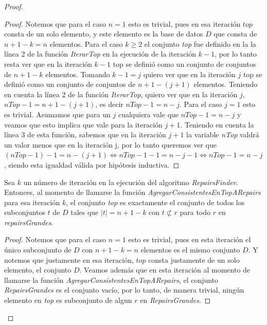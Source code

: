 \documentclass[11pt,a4paper,twoside]{tesis}
\begin{document}
\begin{proof}
\begin{proof}
Notemos que para el caso $n=1$ esto es trivial, pues en esa iteración $top$ consta de un solo elemento, y este elemento es la base de datos $D$ que consta de $n + 1 - k = n$ elementos. Para el caso $k \geq 2$ el conjunto \textit{top} fue definido en la la línea 2 de la función \textit{IterarTop} en la ejecución de la iteración $k-1$, por lo tanto resta ver que en la iteración $k-1$ top se definió como un conjunto de conjuntos de $n + 1 - k$ elementos. Tomando $k - 1 = j$ quiero ver que en la iteración $j$ top se definió como un conjunto de conjuntos de $n + 1 - (j + 1)$ elementos. Teniendo en cuenta la línea 2 de la función \textit{IterarTop}, quiero ver que en la iteración $j$, $nTop-1=n + 1 - (j + 1)$, es decir $nTop-1=n-j$. Para el caso $j=1$ esto es trivial. Asumamos que para un $j$ cualquiera vale que $nTop-1=n-j$ y veamos que esto implica que vale para la iteración $j+1$. Teniendo en cuenta la línea 3 de esta función, sabemos que en la iteración $j+1$ la variable \textit{nTop} valdrá un valor menos que en la iteración j, por lo tanto queremos ver que $(nTop-1) - 1 = n - (j+1) \iff nTop-1 - 1 = n - j -1 \iff nTop-1 = n - j$, siendo esta igualdad válida por hipótesis inductiva.
\end{proof}

\begin{lemma}\label{tamano_top_2}
Sea $k$ un número de iteración en la ejecución del algoritmo \textit{RepairsFinder}. Entonces, al momento de llamarse la función \textit{AgregarConsistentesEnTopARepairs} para esa iteración $k$, el conjunto \textit{top} es exactamente el conjunto de todos los subconjuntos $t$ de $D$ tales que $|t| = n + 1 - k$ con $t \not\subset r$ para todo $r$ en \textit{repairsGrandes}.
\end{lemma}

\begin{proof}
Notemos que para el caso $n=1$ esto es trivial, pues en esta iteración el único subconjunto de $D$ con $n + 1 - k = n$ elementos es el mismo conjunto $D$. Y notemos que justamente en esa iteración, $top$ consta justamente de un solo elemento, el conjunto $D$. Veamos además que en esta iteración al momento de llamarse la función \textit{AgregarConsistentesEnTopARepairs}, el conjunto \textit{RepairsGrandes} es el conjunto vacío, por lo tanto, de manera trivial, ningún elemento en \textit{top} es subconjunto de algun $r$ en \textit{RepairsGrandes}.


\end{proof}
\end{proof}
\end{document}
